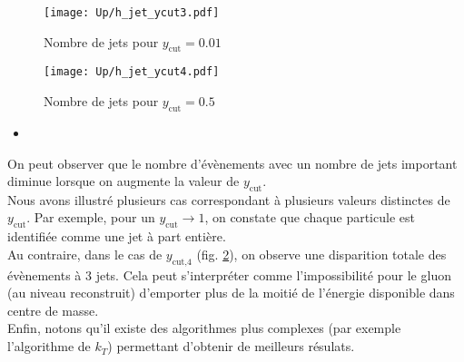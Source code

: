 \documentclass[a4paper]{article} %
\numberwithin{equation}{section} %
\theoremstyle{definition}
\theoremstyle{remark}
\theoremstyle{plain}%
\theoremstyle{style_exemple}
\begin{document}
\endminipage


\begin{figure}[H]
    \centering
    \texttt{[image: Up/h\_jet\_ycut3.pdf]}
    \begin{minipage}{5cm}
        \caption{Nombre de jets pour $y_\text{cut} = 0.01$}
        \label{fig:enter-label}
    \end{minipage}
\end{figure}

\endminipage
\hspace{.0333\textwidth}

\begin{figure}[H]
    \centering
    \texttt{[image: Up/h\_jet\_ycut4.pdf]}
    \begin{minipage}{5cm}
        \centering
        \caption{Nombre de jets pour $y_\text{cut} = 0.5$}
        \label{fig:ycut_4}
    \end{minipage}
\end{figure}
\endminipage
\vspace{0.5cm}
\begin{itemize}
    \item[]
\end{itemize}
On peut observer que le nombre d'évènements avec un nombre de jets important diminue lorsque on augmente la valeur de $y_\text{cut}$. \\
Nous avons illustré plusieurs cas correspondant à plusieurs valeurs distinctes de $y_\text{cut}$. Par exemple, pour un $y_\text{cut} \rightarrow 1$, on constate que chaque particule est identifiée comme une jet à part entière.\\
Au contraire, dans le cas de $y_\text{cut,4}$ (fig. \ref{fig:ycut_4}), on observe une disparition totale des évènements à 3 jets. Cela peut s'interpréter comme l'impossibilité pour le gluon (au niveau reconstruit) d'emporter plus de la moitié de l'énergie disponible dans centre de masse.\\
Enfin, notons qu'il existe des algorithmes plus complexes (par exemple l'algorithme de $k_T$) permettant d'obtenir de meilleurs résulats.
\end{document}
